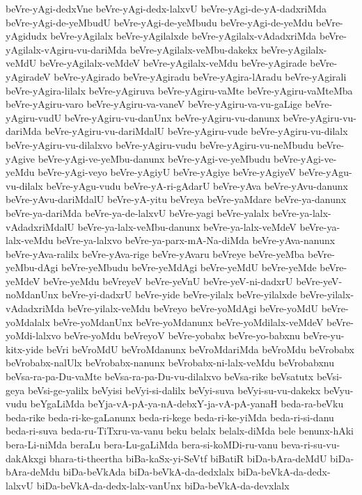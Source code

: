 {beVre-yAgi-dedxVne
beVre-yAgi-dedx-lalxvU
beVre-yAgi-de-yA-dadxriMda
beVre-yAgi-de-yeMbudU
beVre-yAgi-de-yeMbudu
beVre-yAgi-de-yeMdu
beVre-yAgidudx
beVre-yAgilalx
beVre-yAgilalxde
beVre-yAgilalx-vAdadxriMda
beVre-yAgilalx-vAgiru-vu-dariMda
beVre-yAgilalx-veMbu-dakekx
beVre-yAgilalx-veMdU
beVre-yAgilalx-veMdeV
beVre-yAgilalx-veMdu
beVre-yAgirade
beVre-yAgiradeV
beVre-yAgirado
beVre-yAgiradu
beVre-yAgira-lAradu
beVre-yAgirali
beVre-yAgira-lilalx
beVre-yAgiruva
beVre-yAgiru-vaMte
beVre-yAgiru-vaMteMba
beVre-yAgiru-varo
beVre-yAgiru-va-vaneV
beVre-yAgiru-va-vu-gaLige
beVre-yAgiru-vudU
beVre-yAgiru-vu-danUnx
beVre-yAgiru-vu-danunx
beVre-yAgiru-vu-dariMda
beVre-yAgiru-vu-dariMdalU
beVre-yAgiru-vude
beVre-yAgiru-vu-dilalx
beVre-yAgiru-vu-dilalxvo
beVre-yAgiru-vudu
beVre-yAgiru-vu-neMbudu
beVre-yAgive
beVre-yAgi-ve-yeMbu-danunx
beVre-yAgi-ve-yeMbudu
beVre-yAgi-ve-yeMdu
beVre-yAgi-veyo
beVre-yAgiyU
beVre-yAgiye
beVre-yAgiyeV
beVre-yAgu-vu-dilalx
beVre-yAgu-vudu
beVre-yA-ri-gAdarU
beVre-yAva
beVre-yAvu-danunx
beVre-yAvu-dariMdalU
beVre-yA-yitu
beVreya
beVre-yaMdare
beVre-ya-danunx
beVre-ya-dariMda
beVre-ya-de-lalxvU
beVre-yagi
beVre-yalalx
beVre-ya-lalx-vAdadxriMdalU
beVre-ya-lalx-veMbu-danunx
beVre-ya-lalx-veMdeV
beVre-ya-lalx-veMdu
beVre-ya-lalxvo
beVre-ya-parx-mA-Na-diMda
beVre-yAva-nanunx
beVre-yAva-ralilx
beVre-yAva-rige
beVre-yAvaru
beVreye
beVre-yeMba
beVre-yeMbu-dAgi
beVre-yeMbudu
beVre-yeMdAgi
beVre-yeMdU
beVre-yeMde
beVre-yeMdeV
beVre-yeMdu
beVreyeV
beVre-yeVnU
beVre-yeV-ni-dadxrU
beVre-yeV-noMdanUnx
beVre-yi-dadxrU
beVre-yide
beVre-yilalx
beVre-yilalxde
beVre-yilalx-vAdadxriMda
beVre-yilalx-veMdu
beVreyo
beVre-yoMdAgi
beVre-yoMdU
beVre-yoMdalalx
beVre-yoMdanUnx
beVre-yoMdanunx
beVre-yoMdilalx-veMdeV
beVre-yoMdi-lalxvo
beVre-yoMdu
beVreyoV
beVre-yobabx
beVre-yo-babxnu
beVre-yu-kitx-yide
beVri
beVroMdU
beVroMdanunx
beVroMdariMda
beVroMdu
beVrobabx
beVrobabx-nalUlx
beVrobabx-nanunx
beVrobabx-ni-lalx-veMdu
beVrobabxnu
beVsa-ra-pa-Du-vaMte
beVsa-ra-pa-Du-vu-dilalxvo
beVsa-rike
beVsatutx
beVsi-geya
beVsi-ge-yalilx
beVyisi
beVyi-si-dalilx
beVyi-suva
beVyi-su-vu-dakekx
beVyu-vudu
beYgaLiMda
beYja-vA-pA-ya-nA-debxY-ja-vA-pA-yanaH
beda-ra-beVku
beda-rike
beda-ri-ke-gaLanunx
beda-ri-kege
beda-ri-ke-yiMda
beda-ri-si-danu
beda-ri-suva
beda-ru-TiTxru-va-vanu
beku
belalx
belalx-diMda
bele
benunx-hAki
bera-Li-niMda
beraLu
bera-Lu-gaLiMda
bera-si-koMDi-ru-vanu
beva-ri-su-vu-dakAkxgi
bhara-ti-theertha
biBa-kaSx-yi-SeVtf
biBatiR
biDa-bAra-deMdU
biDa-bAra-deMdu
biDa-beVkAda
biDa-beVkA-da-dedxlalx
biDa-beVkA-da-dedx-lalxvU
biDa-beVkA-da-dedx-lalx-vanUnx
biDa-beVkA-da-devxlalx
}
